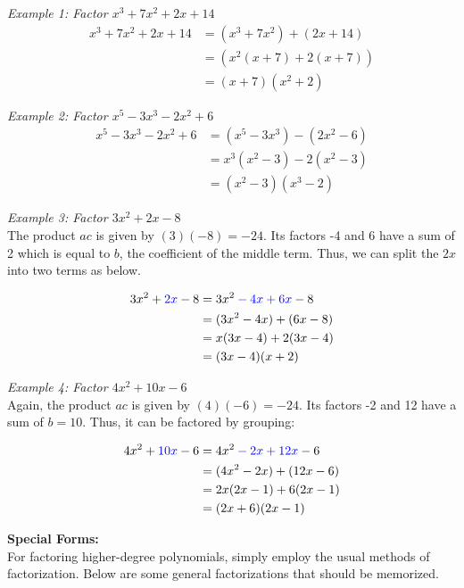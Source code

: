 \documentclass{article}
\begin{document}
    \noindent \color{blue} \textit{Example 1: Factor $x^3+7x^2+2x+14$} \color{black} \\
    \begin{align*}
        x^3+7x^2+2x+14 &= (x^3+7x^2) + (2x+14) \\
        &= (x^2(x+7) + 2(x+7)) \\
        &= (x+7)(x^2+2)
    \end{align*}

    \noindent \color{blue} \textit{Example 2: Factor $x^5-3x^3-2x^2+6$} \color{black} \\
    \begin{align*}
        x^5-3x^3-2x^2+6 &= (x^5-3x^3) - (2x^2-6) \\
        &= x^3(x^2-3) - 2(x^2-3) \\
        &= (x^2-3)(x^3-2)
    \end{align*}

    \noindent \color{blue} \textit{Example 3: Factor $3x^2+2x-8$} \color{black} \\
    The product $ac$ is given by $(3)(-8) = -24$. Its factors -4 and 6 have a sum of 2
    which is equal to $b$, the coefficient of the middle term. Thus, we can split the $2x$
    into two terms as below.

    \begin{align*}
        3x^2+\color{blue}2x\color{black}-8 &= 3x^2\color{blue}-4x+6x\color{black}-8 \\
        &= (3x^2-4x) + (6x-8) \\
        &= x(3x-4) + 2(3x-4) \\
        &= (3x-4)(x+2)
    \end{align*}

    \pagebreak
    \noindent \color{blue} \textit{Example 4: Factor $4x^2+10x-6$} \color{black} \\
    Again, the product $ac$ is given by $(4)(-6) = -24$. Its factors -2 and 12 have a sum
    of $b=10$. Thus, it can be factored by grouping:

    \begin{align*}
        4x^2+\color{blue}10x\color{black}-6 &= 4x^2\color{blue}-2x+12x\color{black}-6 \\
        &= (4x^2-2x) + (12x-6) \\
        &= 2x(2x-1) + 6(2x-1) \\
        &= (2x+6)(2x-1)
    \end{align*}

    \noindent \color{purple} \textbf{Special Forms:} \color{black} \\
    For factoring higher-degree polynomials, simply employ the usual methods of
    factorization. Below are some general factorizations that should be memorized.
\end{document}
